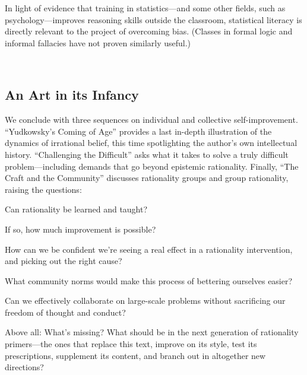 {
 In light of evidence that training in statistics---and some other
fields, such as psychology---improves reasoning skills outside the
classroom, statistical literacy is directly relevant to the project of
overcoming bias. (Classes in formal logic and informal fallacies have
not proven similarly useful.)}

{
 ~}

\subsection{An Art in its Infancy}

{
 We conclude with three sequences on individual and collective
self-improvement. ``Yudkowsky's Coming
of Age'' provides a last in-depth illustration of the
dynamics of irrational belief, this time spotlighting the
author's own intellectual history.
``Challenging the Difficult'' asks
what it takes to solve a truly difficult problem---including demands
that go beyond epistemic rationality. Finally, ``The
Craft and the Community'' discusses rationality
groups and group rationality, raising the questions:}

{
 Can rationality be learned and taught?}

{
 If so, how much improvement is possible?}

{
 How can we be confident we're seeing a real effect
in a rationality intervention, and picking out the right cause?}

{
 What community norms would make this process of bettering
ourselves easier?}

{
 Can we effectively collaborate on large-scale problems without
sacrificing our freedom of thought and conduct?}

{
 Above all: What's missing? What should be in the
next generation of rationality primers---the ones that replace this
text, improve on its style, test its prescriptions, supplement its
content, and branch out in altogether new directions?}

